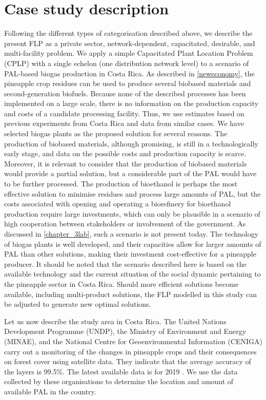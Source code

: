 \section{Case study description}

Following the different types of categorisation described above, we describe the present FLP as a private sector, network-dependent, capacitated, desirable, and multi-facility problem. We apply a simple Capacitated Plant Location Problem (CPLP) with a single echelon (one distribution network level) to a scenario of PAL-based biogas production in Costa Rica. As described in \cref{neweconomy}, the pineapple crop residues can be used to produce several biobased materials and second-generation biofuels. Because none of the described processes has been implemented on a large scale, there is no information on the production capacity and costs of a candidate processing facility. Thus, we use estimates based on previous experiments from Costa Rica and data from similar cases. We have selected biogas plants as the proposed solution for several reasons. The production of biobased materials, although promising, is still in a technologically early stage, and data on the possible costs and production capacity is scarce. Moreover, it is relevant to consider that the production of biobased materials would provide a partial solution, but a considerable part of the PAL would have to be further processed. The production of bioethanol is perhaps the most effective solution to minimise residues and process large amounts of PAL, but the costs associated with opening and operating a biorefinery for bioethanol production require large investments, which can only be plausible in a scenario of high cooperation between stakeholders or involvement of the government. As discussed in \cref{chapter_3lab}, such a scenario is not present today. The technology of biogas plants is well developed, and their capacities allow for larger amounts of PAL than other solutions, making their investment cost-effective for a pineapple producer. It should be noted that the scenario described here is based on the available technology and  the current situation of the social dynamic pertaining to the pineapple sector in Costa Rica. Should more efficient solutions become available, including multi-product solutions, the FLP modelled in this study can be adjusted to generate new optimal solutions. 

Let us now describe the study area in Costa Rica. The United Nations Development Programme (UNDP), the Ministry of Environment and Energy (MINAE), and the National Centre for Geoenvironmental Information (CENIGA) carry out a monitoring of the changes in pineapple crops and their consequences on forest cover using satellite data. They indicate that the average accuracy of the layers is 99.5\%. The latest available data is for 2019 \cite{SNITpina}. We use the data collected by these organisations to determine the location and amount of available PAL in the country.

